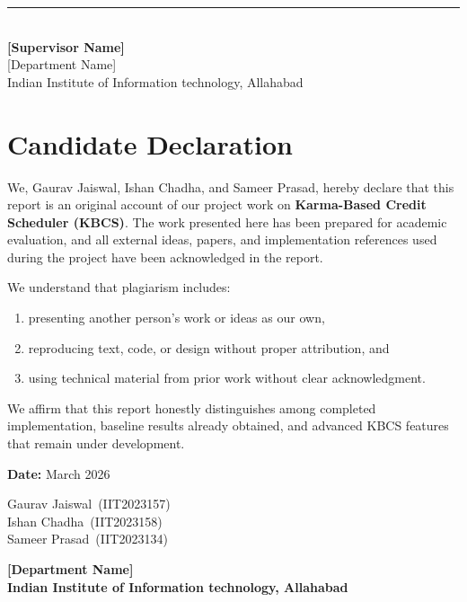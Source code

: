 \documentclass[12pt,a4paper]{report}
\newcommand{\InstitutionName}{Indian Institute of Information technology, Allahabad}
\newcommand{\DepartmentName}{[Department Name]}
\newcommand{\SupervisorName}{[Supervisor Name]}
\newcommand{\StudentOne}{Gaurav Jaiswal}
\newcommand{\StudentTwo}{Ishan Chadha}
\newcommand{\StudentThree}{Sameer Prasad}
\newcommand{\RollOne}{IIT2023157}
\newcommand{\RollTwo}{IIT2023158}
\newcommand{\RollThree}{IIT2023134}
\begin{document}
\vspace{4cm}
\begin{flushright}
  \rule{5cm}{0.4pt} \\
  \vspace{0.2cm}
  \textbf{\SupervisorName} \\
  \vspace{0.2cm}
  \DepartmentName \\
  \InstitutionName
\end{flushright}
\clearpage

\chapter*{Candidate Declaration}
We, \StudentOne, \StudentTwo, and \StudentThree, hereby declare that this report is an original account of our project work on \textbf{Karma-Based Credit Scheduler (KBCS)}. The work presented here has been prepared for academic evaluation, and all external ideas, papers, and implementation references used during the project have been acknowledged in the report.

We understand that plagiarism includes:
\begin{enumerate}
    \item presenting another person's work or ideas as our own,
    \item reproducing text, code, or design without proper attribution, and
    \item using technical material from prior work without clear acknowledgment.
\end{enumerate}

We affirm that this report honestly distinguishes among completed implementation, baseline results already obtained, and advanced KBCS features that remain under development.

\vspace{2cm}
\textbf{Date:} March 2026

\vspace{1cm}
\begin{flushleft}
\StudentOne\ (\RollOne) \\
\StudentTwo\ (\RollTwo) \\
\StudentThree\ (\RollThree)
\end{flushleft}

\vspace{1cm}
\begin{flushleft}
\textbf{\DepartmentName} \\
\textbf{\InstitutionName}
\end{flushleft}
\clearpage
\end{document}
